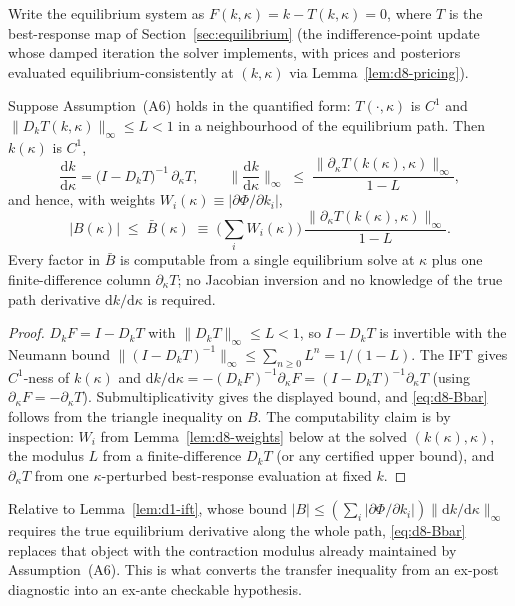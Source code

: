 Write the equilibrium system as $F(k,\kappa)=k-T(k,\kappa)=0$, where $T$ is the best-response map of Section~\ref{sec:equilibrium} (the indifference-point update whose damped iteration the solver implements, with prices and posteriors evaluated equilibrium-consistently at $(k,\kappa)$ via Lemma~\ref{lem:d8-pricing}).

\begin{lemma}
\label{lem:d8-cutoff}
Suppose Assumption~\textup{(A6)} holds in the quantified form: $T(\cdot,\kappa)$ is $C^{1}$ and $\|D_kT(k,\kappa)\|_{\infty}\le L<1$ in a neighbourhood of the equilibrium path. Then $k(\kappa)$ is $C^{1}$,
\[
\frac{\mathrm{d} k}{\mathrm{d}\kappa}
=\big(I-D_kT\big)^{-1}\,\partial_\kappa T ,
\qquad
\Big\|\frac{\mathrm{d} k}{\mathrm{d}\kappa}\Big\|_{\infty}
\;\le\;\frac{\|\partial_\kappa T(k(\kappa),\kappa)\|_{\infty}}{1-L},
\]
and hence, with weights $W_i(\kappa)\equiv|\partial\Phi/\partial k_i|$,
\begin{equation}
|B(\kappa)|\;\le\;\bar B(\kappa)\;\equiv\;\Big(\sum_{i}W_i(\kappa)\Big)\,
\frac{\|\partial_\kappa T(k(\kappa),\kappa)\|_{\infty}}{1-L}.
\label{eq:d8-Bbar}
\end{equation}
Every factor in $\bar B$ is computable from a single equilibrium solve at $\kappa$ plus one finite-difference column $\partial_\kappa T$; no Jacobian inversion and no knowledge of the true path derivative $\mathrm{d} k/\mathrm{d}\kappa$ is required.
\end{lemma}

\begin{proof}
$D_kF=I-D_kT$ with $\|D_kT\|_\infty\le L<1$, so $I-D_kT$ is invertible with the Neumann bound $\|(I-D_kT)^{-1}\|_{\infty}\le\sum_{n\ge0}L^{n}=1/(1-L)$. The IFT gives $C^{1}$-ness of $k(\kappa)$ and $\mathrm{d} k/\mathrm{d}\kappa=-(D_kF)^{-1}\partial_\kappa F=(I-D_kT)^{-1}\partial_\kappa T$ (using $\partial_\kappa F=-\partial_\kappa T$). Submultiplicativity gives the displayed bound, and \eqref{eq:d8-Bbar} follows from the triangle inequality on $B$. The computability claim is by inspection: $W_i$ from Lemma~\ref{lem:d8-weights} below at the solved $(k(\kappa),\kappa)$, the modulus $L$ from a finite-difference $D_kT$ (or any certified upper bound), and $\partial_\kappa T$ from one $\kappa$-perturbed best-response evaluation at fixed $k$.
\end{proof}

Relative to Lemma~\ref{lem:d1-ift}, whose bound $|B|\le(\sum_i|\partial\Phi/\partial k_i|)\|\mathrm{d} k/\mathrm{d}\kappa\|_\infty$ requires the true equilibrium derivative along the whole path, \eqref{eq:d8-Bbar} replaces that object with the contraction modulus already maintained by Assumption~\textup{(A6)}. This is what converts the transfer inequality from an ex-post diagnostic into an ex-ante checkable hypothesis.


